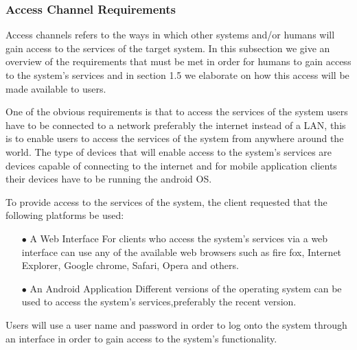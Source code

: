 \documentclass[a4paper,12pt]{article}
\begin{document}
\subsubsection{Access Channel Requirements}
\begin{flushleft}
Access channels refers to the ways in which other systems and/or humans will gain access to the services of the target system. In this subsection we give an overview of the requirements that must be met in order for humans to gain access to the system's services and in section 1.5 we elaborate on how this access will be made available to users.

One of the obvious requirements is that to access the services of the system users have to be connected to a network preferably the internet instead of a LAN, this is to enable users to access the services of the system from anywhere around the world. The type of devices that will enable access to the system's services are devices capable of connecting to the internet and for mobile application clients their devices have to be running the android OS.

To provide access to the services of the system, the client requested that the following platforms
be used:
\begin{itemize}
\item[$\bullet$]A Web Interface
For clients who access the system's services via a web interface can use any of the available web   		browsers such as fire fox, Internet Explorer, Google chrome, Safari, Opera and others. 
\item[$\bullet$]An Android Application
Different versions of the operating system can be used to access the system's services,preferably the recent version.
\\
\end{itemize} 
Users will use a user name and password in order to log onto the system through an interface in order to gain access to the system's functionality.
\end{flushleft}
\end{document}
